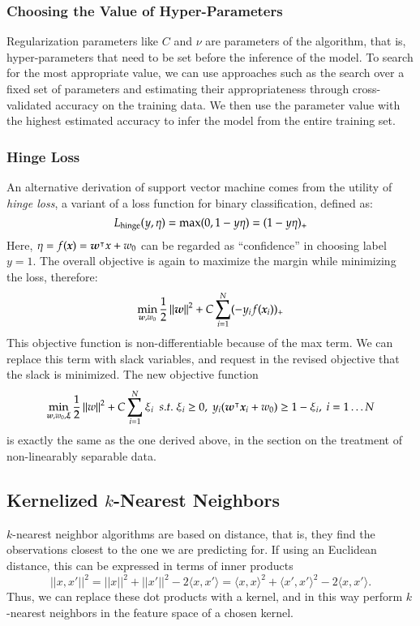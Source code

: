 \begin{refsection}
\subsubsection*{Choosing the Value of Hyper-Parameters}

Regularization parameters like $C$ and $\nu$ are parameters of the algorithm, that is, hyper-parameters that need to be set before the inference of the model. To search for the most appropriate value, we can use approaches such as the search over a fixed set of parameters and estimating their appropriateness through cross-validated accuracy on the training data. We then use the parameter value with the highest estimated accuracy to infer the model from the entire training set.

\subsubsection*{Hinge Loss}

An alternative derivation of support vector machine comes from the utility of {\em hinge loss}, a variant of a loss function for binary classification, defined as:
$$ L_{\rm hinge}(y, \eta) = \max(0, 1-y\eta) = (1-y\eta)_{+} $$
Here, $\eta=f(\boldsymbol{x})=\boldsymbol{w}^\intercal x + w_0$ can be regarded as ``confidence'' in choosing label $y=1$. The overall objective is again to maximize the margin while minimizing the loss, therefore:
$$ \min_{\boldsymbol{w},w_0}{1\over 2}\left\lVert\boldsymbol{w}\right\rVert^2 + C\sum_{i=1}^N(-y_i f(\boldsymbol{x}_i))_{+} $$
This objective function is non-differentiable because of the max term. We can replace this term with slack variables, and request in the revised objective that the slack is minimized. The new objective function 
$$ \min_{\boldsymbol{w},w_0,\boldsymbol{\xi}} {1\over 2}\left\lVert w\right\rVert^2+C\sum_{i=1}^N\xi_i\ \ s.t.\ \xi_i\geq 0,\ y_i(\boldsymbol{w}^\intercal \boldsymbol{x}_i+w_0)\geq 1-\xi_i,\ i=1\ldots N$$
is exactly the same as the one derived above, in the section on the treatment of non-linearably separable data.


\subsection*{Kernelized $k$-Nearest Neighbors}

$k$-nearest neighbor algorithms are based on distance, that is, they find the observations closest to the one we are predicting for. If using an Euclidean distance, this can be expressed in terms of inner products 
%
$$\lvert\lvert x, x' \rvert\rvert^2 =  \lvert\lvert x \rvert\rvert^2 + \lvert\lvert x' \rvert\rvert^2 - 2 \langle x, x'\rangle  =  \langle x, x\rangle^2 + \langle x', x'\rangle^2 - 2 \langle x, x'\rangle.$$
%
Thus, we can replace these dot products with a kernel, and in this way perform $k$-nearest neighbors in the feature space of a chosen kernel.


\end{refsection}
